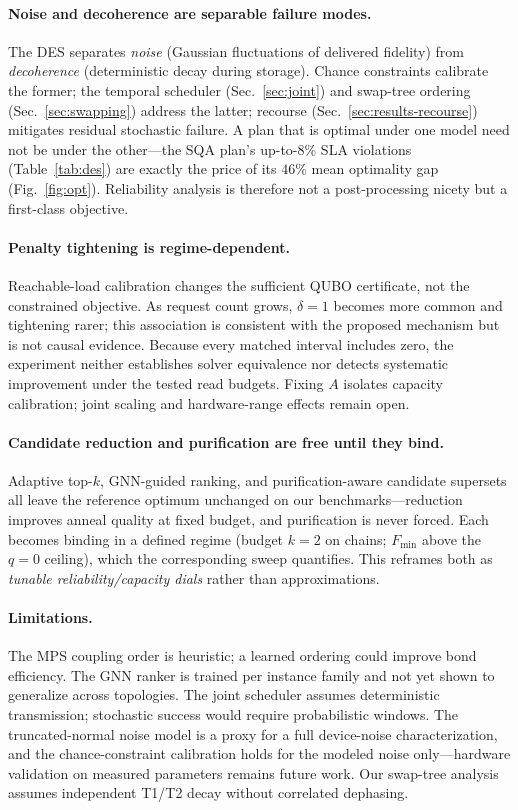 \documentclass[twocolumn]{article}
\begin{document}
\paragraph{Noise and decoherence are separable failure modes.}
The DES separates \emph{noise} (Gaussian fluctuations of delivered
fidelity) from \emph{decoherence} (deterministic decay during
storage).  Chance constraints calibrate the former; the temporal
scheduler (Sec.~\ref{sec:joint}) and swap-tree ordering
(Sec.~\ref{sec:swapping}) address the latter; recourse
(Sec.~\ref{sec:results-recourse}) mitigates residual stochastic
failure.  A plan that is optimal under one model need not be under the
other---the SQA plan's up-to-$8\%$ SLA violations (Table~\ref{tab:des})
are exactly the price of its $46\%$ mean optimality gap
(Fig.~\ref{fig:opt}).  Reliability analysis is therefore not a
post-processing nicety but a first-class objective.

\paragraph{Penalty tightening is regime-dependent.}
Reachable-load calibration changes the sufficient QUBO certificate,
not the constrained objective.  As request count grows, $\delta=1$
becomes more common and tightening rarer; this association is
consistent with the proposed mechanism but is not causal evidence.
Because every matched interval includes zero, the experiment neither
establishes solver equivalence nor detects systematic improvement under
the tested read budgets.  Fixing $A$ isolates capacity calibration;
joint scaling and hardware-range effects remain open.

\paragraph{Candidate reduction and purification are free until they
bind.}  Adaptive top-$k$, GNN-guided ranking, and purification-aware
candidate supersets all leave the reference optimum unchanged on our
benchmarks---reduction improves anneal quality at fixed budget, and
purification is never forced.  Each becomes binding in a defined
regime (budget $k=2$ on chains; $F_{\min}$ above the $q{=}0$ ceiling),
which the corresponding sweep quantifies.  This reframes both as
\emph{tunable reliability/capacity dials} rather than approximations.

\paragraph{Limitations.}  The MPS coupling order is heuristic; a
learned ordering could improve bond efficiency.  The GNN ranker is
trained per instance family and not yet shown to generalize across
topologies.  The joint scheduler assumes deterministic transmission;
stochastic success would require probabilistic windows.  The
truncated-normal noise model is a proxy for a full device-noise
characterization, and the chance-constraint calibration holds for the
modeled noise only---hardware validation on measured parameters
remains future work.  Our swap-tree analysis assumes independent T1/T2
decay without correlated dephasing.
\end{document}
